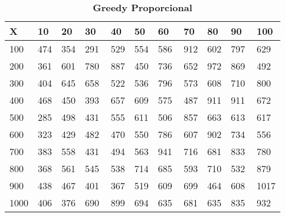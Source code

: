 \documentclass[10pt,letterpaper]{article}
\begin{document}
\begin{center}
\begin{table}\renewcommand{\arraystretch}{2.5}
\caption{\large \textbf{Greedy Proporcional}}
\centering
\begin{tabular} { |m{0.5cm}|m{1.3cm}|m{1.3cm}|m{1.3cm}|m{1.3cm}|m{1.3cm}|m{1.3cm}|m{1.3cm}|m{1.3cm}|m{1.3cm}|m{1.3cm}|} 
\hline
\rowcolor{Gray}
\centering \textbf{X} & \centering \textbf{10} & \centering \textbf{20} & \centering \textbf{30}\ & \centering \textbf{40} & \centering \textbf{50} & \centering \textbf{60}\ & \centering \textbf{70} & \centering \textbf{80} & \centering \textbf{90}\ & \textbf{100} \\\hline
\cellcolor{Gray}100 & \Large 474 & \Large 354 & \Large 291 & \Large 529 & \Large 554 & \Large 586 & \Large 912 & \Large 602 & \Large 797 & \Large 629 \\
\hline
\cellcolor{Gray}200 & \Large 361 & \Large 601 & \Large 780 & \Large 887 & \Large 450 & \Large 736 & \Large 652 & \Large 972 & \Large 869 & \Large 492 \\
\hline
\cellcolor{Gray}300 & \Large 404 & \Large 645 & \Large 658 & \Large 522 & \Large 536 & \Large 796 & \Large 573 & \Large 608 & \Large 710 & \Large 800 \\
\hline
\cellcolor{Gray}400 & \Large 468 & \Large 450 & \Large 393 & \Large 657 & \Large 609 & \Large 575 & \Large 487 & \Large 911 & \Large 911 & \Large 672 \\
\hline
\cellcolor{Gray}500 & \Large 285 & \Large 498 & \Large 431 & \Large 555 & \Large 611 & \Large 506 & \Large 857 & \Large 663 & \Large 613 & \Large 617 \\
\hline
\cellcolor{Gray}600 & \Large 323 & \Large 429 & \Large 482 & \Large 470 & \Large 550 & \Large 786 & \Large 607 & \Large 902 & \Large 734 & \Large 556 \\
\hline
\cellcolor{Gray}700 & \Large 383 & \Large 558 & \Large 431 & \Large 494 & \Large 563 & \Large 941 & \Large 716 & \Large 681 & \Large 833 & \Large 780 \\
\hline
\cellcolor{Gray}800 & \Large 368 & \Large 561 & \Large 545 & \Large 538 & \Large 714 & \Large 685 & \Large 593 & \Large 710 & \Large 532 & \Large 879 \\
\hline
\cellcolor{Gray}900 & \Large 438 & \Large 467 & \Large 401 & \Large 367 & \Large 519 & \Large 609 & \Large 699 & \Large 464 & \Large 608 & \Large 1017 \\
\hline
\cellcolor{Gray}1000 & \Large 406 & \Large 376 & \Large 690 & \Large 899 & \Large 694 & \Large 635 & \Large 681 & \Large 635 & \Large 835 & \Large 932 \\
\hline
\end{tabular} \\
\end{table}
\end{center}
\end{document}

